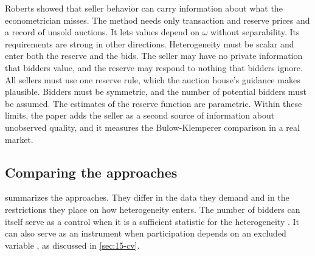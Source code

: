 Roberts showed that seller behavior can carry information about what the econometrician misses. The
method needs only transaction and reserve prices and a record of unsold auctions. It lets values depend
on $\omega$ without separability. Its requirements are strong in other directions. Heterogeneity must be scalar and enter
both the reserve and the bids. The seller may have no private information that bidders value, and the
reserve may respond to nothing that bidders ignore. All sellers must use one reserve rule, which the
auction house's guidance makes plausible. Bidders must be symmetric, and the number of potential
bidders must be assumed. The estimates of the reserve function are parametric. Within these limits,
the paper adds the seller as a second source of information about unobserved quality, and it measures
the Bulow-Klemperer comparison in a real market.

\subsection{Comparing the approaches}\label{sec:15-uh-compare}

 summarizes the approaches. They differ in the data they demand and in the
restrictions they place on how heterogeneity enters. The number of bidders can itself serve as a control
when it is a sufficient statistic for the heterogeneity \citep[Section 3.2]{CampoPerrigneVuong2003}. It
can also serve as an instrument when participation depends on an excluded variable
\citep{HaileHongShum2003}, as discussed in \cref{sec:15-cv}.


